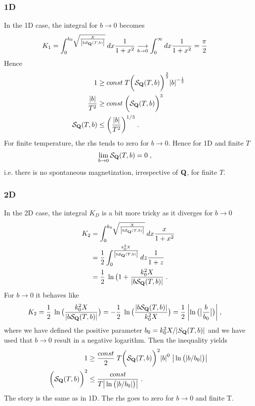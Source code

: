 \subsubsection{1D}
%
In the 1D case, the integral for $b\to 0$ becomes
%
\begin{align*}
K_{1}&=\int_{0}^{k_{0}\sqrt{\frac{X }{   \abs{b {\cal S}_{\mathbf Q}(T,b)}}} }dx 
   \frac{1}{1 +  x^{2}}\underset{b\to 0}{ \longrightarrow }
\int_{0}^{\infty}dx  \frac{1}{1 +  x^{2}}    = \frac{\pi}{2}
\end{align*}
%
Hence 
%
\begin{align*}
1&\ge  const \;T \bigg({\cal S}_{\mathbf Q}(T,b)\bigg)^{\frac{3}{2}}
  \abs{b}^{-\frac{1}{2}}\\
\frac{  \abs{b}}{T^{2}}&\ge const \;\bigg( {\cal S}_{\mathbf Q}(T,b)\bigg)^{3}\\
{\cal S}_{\mathbf Q}(T,b)&\le \bigg(\frac{  \abs{b}}{T^{2}}\bigg)^{1/3} \;.
\end{align*}
%
For finite temperature, the rhs tends to zero for $b\to 0$.
Hence for 1D and finite $T$
%
\begin{align}\label{eq:}
\lim_{b\to 0}{\cal S}_{\mathbf Q}(T,b)&= 0 \;,
\end{align}
%
i.e. there is no spontaneous magnetization, irrespective of $\mathbf Q$, for finite $T$.
\subsubsection{2D}
%
In the 2D case, the integral $K_{D}$  is a bit more tricky as it diverges for $b\to 0$
%
\begin{align*}
K_{2}&=\int_{0}^{k_{0}\sqrt{\frac{X }{   \abs{b {\cal S}_{\mathbf Q}(T,b)}}} }dx 
   \frac{x}{1 +  x^{2}}\\
   &=\frac{1}{2}\int_{0}^{\frac{k_{0}^{2} X}{  \abs{b {\cal S}_{\mathbf Q}(T,b)}}}  dz
   \frac{1}{1 +  z}\\
   &=\frac{1}{2}\;\ln\big( 1+\frac{k_{0}^{2} X}{  \abs{b {\cal S}_{\mathbf Q}(T,b)}} \;.
\end{align*}
%
For $b\to 0$ it behaves like
%
\begin{align*}
  K_{2} &=\frac{1}{2}\;\ln\big( \frac{k_{0}^{2} X}{  \abs{b {\cal S}_{\mathbf Q}(T,b)}} \big)
  = -\frac{1}{2}\;\ln\big( 
  \frac{  \abs{b {\cal S}_{\mathbf Q}(T,b)}} {k_{0}^{2} X}
  \big)
  = \frac{1}{2}\;
  \abs{\ln\big( 
  \big|\frac{b}{b_{0}}\big|\big)}\;,
\end{align*}
%
where we have defined the positive parameter $b_{0}= k_{0}^{2} X / |S_{\mathbf Q}(T,b)|$ and we have used that $b\to 0$ result in a negative logarithm.
%
Then  the inequality  yields 
%
\begin{align*}
1&\ge \frac{const}{2} \;T \bigg({\cal S}_{\mathbf Q}(T,b)\bigg)^{2}
  \abs{b}^{0} \;\big|  \ln\big( \abs{b/b_{0}}  \big)\big|
  \\
   \bigg({\cal S}_{\mathbf Q}(T,b)\bigg)^{2}&\le\frac{const}{T
  \big|  \ln\big( \abs{b/b_{0}}  \big)\big| 
   } \;.
\end{align*}
%
The story is the same as in 1D. The rhs goes to zero for $b\to 0$ and finite T.

